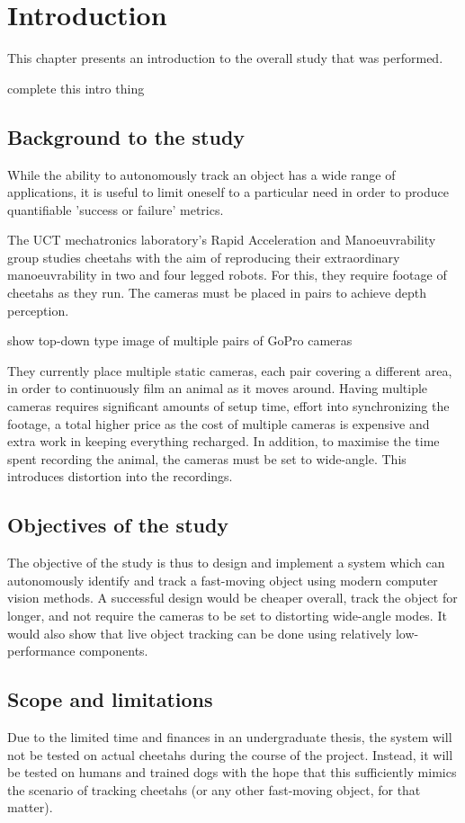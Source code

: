 \chapter{Introduction}
This chapter presents an introduction to the overall study that was performed. 

{\Large \color{red} complete this intro thing}

\section{Background to the study}
While the ability to autonomously track an object has a wide range of applications, it is useful to limit oneself to a particular need in order to produce quantifiable 'success or failure' metrics.

The UCT mechatronics laboratory's Rapid Acceleration and Manoeuvrability group studies cheetahs with the aim of reproducing their extraordinary manoeuvrability in two and four legged robots. For this, they require footage of cheetahs as they run. The cameras must be placed in pairs to achieve depth perception.

\vskip 15mm
{\Large \color{red} show top-down type image of multiple pairs of GoPro cameras}
\vskip 15mm

They currently place multiple static cameras, each pair covering a different area, in order to continuously film an animal as it moves around. Having multiple cameras requires significant amounts of setup time, effort into synchronizing the footage, a total higher price as the cost of multiple cameras is expensive and extra work in keeping everything recharged. In addition, to maximise the time spent recording the animal, the cameras must be set to wide-angle. This introduces distortion into the recordings.


\section{Objectives of the study}
The objective of the study is thus to design and implement a system which can autonomously identify and track a fast-moving object using modern computer vision methods. A successful design would be cheaper overall, track the object for longer, and not require the cameras to be set to distorting wide-angle modes. It would also show that live object tracking can be done using relatively low-performance components.


\section{Scope and limitations}
Due to the limited time and finances in an undergraduate thesis, the system will not be tested on actual cheetahs during the course of the project. Instead, it will be tested on humans and trained dogs with the hope that this sufficiently mimics the scenario of tracking cheetahs (or any other fast-moving object, for that matter).

